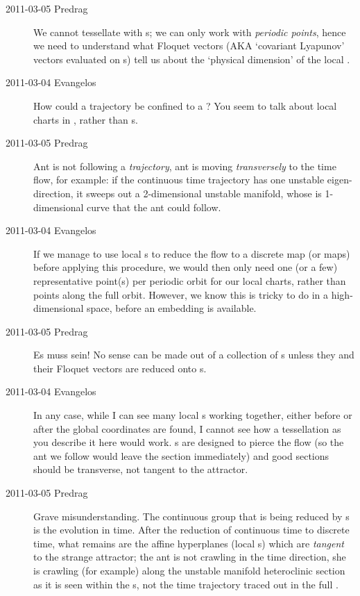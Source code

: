 \begin{description}
\item[2011-03-05 Predrag]
  We cannot tessellate with \po s; we can only work with \emph{periodic
    points}, hence we need to understand what Floquet vectors (AKA `covariant
  Lyapunov' vectors evaluated on \po s) tell us about the `physical
  dimension' of the local {\PoincSec}.

\item[2011-03-04 Evangelos]
  How could a trajectory be confined to a {\PoincSec}? You seem
  to talk about local charts in , rather than {\PoincSec s}.

\item[2011-03-05 Predrag]
  Ant is not following a \emph{trajectory}, ant is moving \emph{transversely}
  to the time flow, for example: if the continuous time trajectory has one
  unstable eigen-direction, it sweeps out a 2-dimensional unstable manifold,
  whose {\PoincSec} is 1-dimensional curve that the ant could follow.

\item[2011-03-04 Evangelos]
  If we manage to use local {\PoincSec s} to reduce the flow to a
  discrete map (or maps) before applying this procedure, we would then only
  need one (or a few) representative point(s) per periodic orbit for our
  local charts, rather than points along the full orbit. However, we know
  this is tricky to do in a high-dimensional space, before an embedding is
  available.

\item[2011-03-05 Predrag]
  {Es muss sein!} No sense can be made out of a collection of \po s unless
  they and their Floquet vectors are reduced onto  {\PoincSec s}.

\item[2011-03-04 Evangelos]
  In any case, while I can see many local {\PoincSec s} working
  together, either before or after the global coordinates are found, I
  cannot see how a tessellation as you describe it here would work.
  {\PoincSec s} are designed to pierce the flow (so the ant we follow
  would leave the section immediately) and good sections should be
  transverse, not tangent to the attractor.

\item[2011-03-05 Predrag] Grave misunderstanding. The continuous group
  that is being reduced by {\PoincSec s} is the evolution in time.
  After the reduction of continuous time to discrete time, what remains are
  the affine hyperplanes (local {\PoincSec s}) which are
  \emph{tangent} to the strange attractor; the ant is not crawling in the
  time direction, she is crawling (for example) along the unstable manifold
  heteroclinic section as it is seen within the {\PoincSec s}, not the
  time trajectory traced out in the full \statesp.


\end{description}
